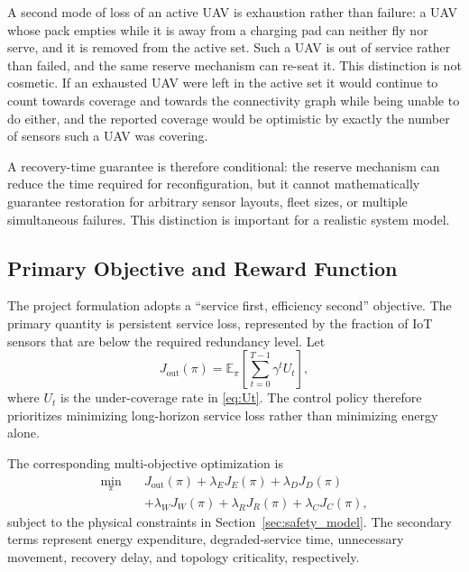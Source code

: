 \documentclass[conference]{IEEEtran}
\begin{document}
A second mode of loss of an active UAV is exhaustion rather than failure: a UAV whose pack empties while it is away from a charging pad can neither fly nor serve, and it is removed from the active set. Such a UAV is out of service rather than failed, and the same reserve mechanism can re-seat it. This distinction is not cosmetic. If an exhausted UAV were left in the active set it would continue to count towards coverage and towards the connectivity graph while being unable to do either, and the reported coverage would be optimistic by exactly the number of sensors such a UAV was covering.

A recovery-time guarantee is therefore conditional: the reserve mechanism can reduce the time required for reconfiguration, but it cannot mathematically guarantee restoration for arbitrary sensor layouts, fleet sizes, or multiple simultaneous failures. This distinction is important for a realistic system model.

\subsection{Primary Objective and Reward Function}
The project formulation adopts a ``service first, efficiency second'' objective. The primary quantity is persistent service loss, represented by the fraction of IoT sensors that are below the required redundancy level. Let
\begin{equation}
J_{\mathrm{out}}(\pi)=\mathbb E_{\pi}\left[\sum_{t=0}^{T-1}\gamma^t U_t\right],
\label{eq:primaryobjective}
\end{equation}
where $U_t$ is the under-coverage rate in \eqref{eq:Ut}. The control policy therefore prioritizes minimizing long-horizon service loss rather than minimizing energy alone.

The corresponding multi-objective optimization is
\begin{equation}
\begin{aligned}
\min_{\pi}\quad &J_{\mathrm{out}}(\pi)+\lambda_EJ_E(\pi)+\lambda_DJ_D(\pi)\\
&+\lambda_WJ_W(\pi)+\lambda_RJ_R(\pi)+\lambda_CJ_C(\pi),
\end{aligned}
\label{eq:multiobjective}
\end{equation}
subject to the physical constraints in Section~\ref{sec:safety_model}. The secondary terms represent energy expenditure, degraded-service time, unnecessary movement, recovery delay, and topology criticality, respectively.
\end{document}
